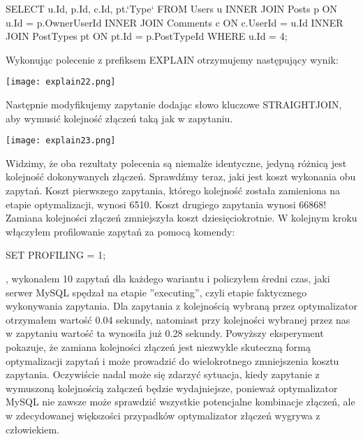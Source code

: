 \begin{spverbatim}
	SELECT u.Id, p.Id, c.Id, pt.`Type` FROM Users u INNER JOIN Posts p ON u.Id = p.OwnerUserId	INNER JOIN Comments c ON c.UserId = u.Id INNER JOIN PostTypes pt ON pt.Id = p.PostTypeId WHERE u.Id = 4;
\end{spverbatim}

Wykonując polecenie z prefiksem EXPLAIN otrzymujemy następujący wynik:
\begin{center}
	\texttt{[image: explain22.png]} 
\end{center}
Następnie modyfikujemy zapytanie dodając słowo kluczowe STRAIGHT\textunderscore JOIN, aby wymusić kolejność złączeń taką jak w zapytaniu.
\begin{center}
	\texttt{[image: explain23.png]} 
\end{center}
Widzimy, że oba rezultaty polecenia są niemalże identyczne, jedyną różnicą jest kolejność dokonywanych złączeń. Sprawdźmy teraz, jaki jest koszt wykonania obu zapytań. Koszt pierwszego zapytania, którego kolejność została zamieniona na etapie optymalizacji, wynosi 6510. Koszt drugiego zapytania wynosi 66868! Zamiana kolejności złączeń zmniejszyła koszt dziesięciokrotnie.
W kolejnym kroku włączyłem profilowanie zapytań za pomocą komendy:
\begin{spverbatim}
	SET PROFILING = 1;
\end{spverbatim}, wykonałem 10 zapytań dla każdego wariantu i policzyłem średni czas, jaki serwer MySQL spędzał na etapie ''executing'', czyli etapie faktycznego wykonywania zapytania. Dla zapytania z kolejnością wybraną przez optymalizator otrzymałem wartość 0.04 sekundy, natomiast przy kolejności wybranej przez nas w zapytaniu wartość ta wynosiła już 0.28 sekundy. Powyższy eksperyment pokazuje, że zamiana kolejności złączeń jest niezwykle skuteczną formą optymalizacji zapytań i może prowadzić do wielokrotnego zmniejszenia kosztu zapytania. Oczywiście nadal może się zdarzyć sytuacja, kiedy zapytanie z wymuszoną kolejnością załączeń będzie wydajniejsze, ponieważ optymalizator MySQL nie zawsze może sprawdzić wszystkie potencjalne kombinacje złączeń, ale w zdecydowanej większości przypadków optymalizator złączeń wygrywa z człowiekiem.

